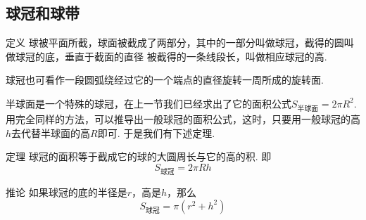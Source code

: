 \subsection{球冠和球带}

\begin{thm}
{定义} 球被平面所截，球面被截成了两部分，其中的一部分叫做球冠，截得的圆叫做球冠的底，垂直于截面的直径
被截得的一条线段长，叫做相应球冠的高.    
\end{thm}

球冠也可看作一段圆弧绕经过它的一个端点的直径旋转一周所成的旋转面.

半球面是一个特殊的球冠，在上一节我们已经求出了它的面积公式$S_{\text{半球面}}=2\pi R^2$. 用完全同样的方法，可以推导出一般球冠的面积公式，这时，只要用一般球冠的高$h$去代替半球面的高$R$即可. 于是我们有下述定理.

\begin{thm}
    {定理} 球冠的面积等于截成它的球的大圆周长与它的高的积. 
即
\[S_{\text{球冠}}=2\pi Rh\]
\end{thm}


\begin{thm}
    {推论} 如果球冠的底的半径是$r$，高是$h$，那么
\[S_{\text{球冠}}=\pi (r^2+h^2)\]
\end{thm}



